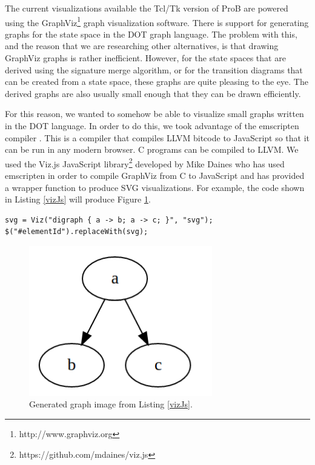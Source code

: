 The current visualizations available the Tcl/Tk version of ProB are powered using the GraphViz\footnote{http://www.graphviz.org} graph visualization software. There is support for generating graphs for the state space in the DOT graph language. The problem with this, and the reason that we are researching other alternatives, is that drawing GraphViz graphs is rather inefficient. However, for the state spaces that are derived using the signature merge algorithm, or for the transition diagrams that can be created from a state space, these graphs are quite pleasing to the eye. The derived graphs are also usually small enough that they can be drawn efficiently.

For this reason, we wanted to somehow be able to visualize small graphs written in the DOT language. In order to do this, we took advantage of the emscripten compiler \cite{emscripten}. This is a compiler that compiles LLVM bitcode to JavaScript so that it can be run in any modern browser. C programs can be compiled to LLVM. We used the Viz.js JavaScript library\footnote{https://github.com/mdaines/viz.js} developed by Mike Daines who has used emscripten in order to compile GraphViz from C to JavaScript and has provided a wrapper function to produce SVG visualizations. For example, the code shown in Listing \ref{vizJs} will produce Figure \ref{graphVizEx}.

\begin{lstlisting}[caption=Create a visualization with viz.js and insert it into an html page.,label=vizJs]
svg = Viz("digraph { a -> b; a -> c; }", "svg");
$("#elementId").replaceWith(svg);
\end{lstlisting}

\begin{center}
\begin{figure}[h!]
\centering
\includegraphics[width=8cm]{bilder/graphVizExample.png}
\caption{Generated graph image from Listing \ref{vizJs}.}
\label{graphVizEx}
\end{figure}
\end{center}